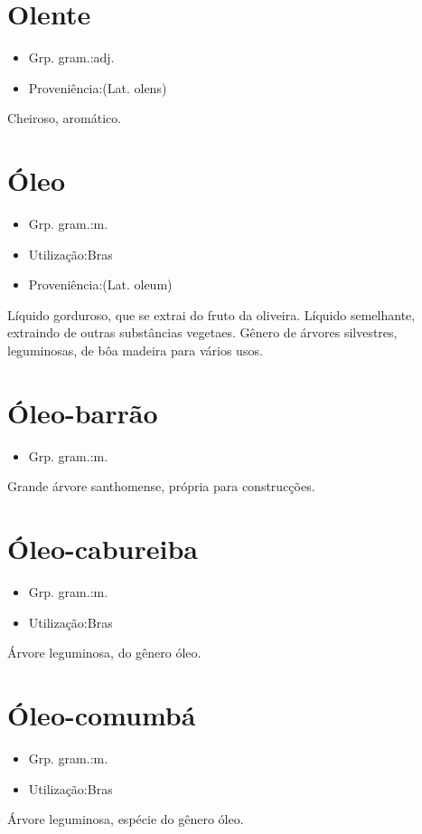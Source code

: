 \section{Olente}
\begin{itemize}
\item {Grp. gram.:adj.}
\end{itemize}
\begin{itemize}
\item {Proveniência:(Lat. \textunderscore olens\textunderscore )}
\end{itemize}
Cheiroso, aromático.
\section{Óleo}
\begin{itemize}
\item {Grp. gram.:m.}
\end{itemize}
\begin{itemize}
\item {Utilização:Bras}
\end{itemize}
\begin{itemize}
\item {Proveniência:(Lat. \textunderscore oleum\textunderscore )}
\end{itemize}
Líquido gorduroso, que se extrai do fruto da oliveira.
Líquido semelhante, extraindo de outras substâncias vegetaes.
Gênero de árvores silvestres, leguminosas, de bôa madeira para vários usos.
\section{Óleo-barrão}
\begin{itemize}
\item {Grp. gram.:m.}
\end{itemize}
Grande árvore santhomense, própria para construcções.
\section{Óleo-cabureiba}
\begin{itemize}
\item {Grp. gram.:m.}
\end{itemize}
\begin{itemize}
\item {Utilização:Bras}
\end{itemize}
Árvore leguminosa, do gênero \textunderscore óleo\textunderscore .
\section{Óleo-comumbá}
\begin{itemize}
\item {Grp. gram.:m.}
\end{itemize}
\begin{itemize}
\item {Utilização:Bras}
\end{itemize}
Árvore leguminosa, espécie do gênero \textunderscore óleo\textunderscore .
